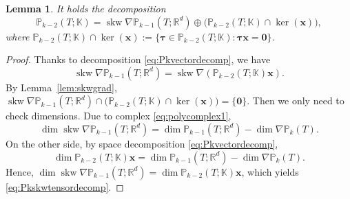\documentclass[10pt]{amsart}
\newtheorem{lemma}[theorem]{Lemma}
\newcommand{\skw}{\operatorname{skw}}
\numberwithin{equation}{section}
\begin{document}
\begin{lemma}
It holds the decomposition
\begin{equation}\label{eq:Pkskwtensordecomp}  
\mathbb P_{k-2}(T;\mathbb K)=\skw\nabla\mathbb P_{k-1}(T;\mathbb R^d)\oplus\big(\mathbb P_{k-2}(T;\mathbb K)\cap\ker(\boldsymbol{x})\big),
\end{equation}
where $\mathbb P_{k-2}(T;\mathbb K)\cap\ker(\boldsymbol{x}):=\{\boldsymbol{\tau}\in\mathbb P_{k-2}(T;\mathbb K): \boldsymbol{\tau}\boldsymbol{x}=\boldsymbol{0}\}$.
\end{lemma}
\begin{proof}
Thanks to decomposition \eqref{eq:Pkvectordecomp}, we have 
\[
\skw\nabla\mathbb P_{k-1}(T;\mathbb R^d)=\skw\nabla(\mathbb P_{k-2}(T;\mathbb K)\boldsymbol{x}).
\]
By Lemma~\ref{lem:skwgrad}, $\skw\nabla\mathbb P_{k-1}(T;\mathbb R^d)\cap\big(\mathbb P_{k-2}(T;\mathbb K)\cap\ker(\boldsymbol{x})\big)=\{\boldsymbol{0}\}$. Then we only need to check dimensions.
Due to complex \eqref{eq:polycomplex1},
\begin{equation}\label{eq:20220324-1}  
\dim\skw\nabla\mathbb P_{k-1}(T;\mathbb R^d)=\dim\mathbb P_{k-1}(T;\mathbb R^d)-\dim\nabla\mathbb P_k(T).
\end{equation}
On the other side, by space decomposition \eqref{eq:Pkvectordecomp},
\[
\dim\mathbb P_{k-2}(T;\mathbb K)\boldsymbol{x}=\dim\mathbb P_{k-1}(T;\mathbb R^{d})-\dim\nabla\mathbb P_k(T).
\]
Hence, $\dim\skw\nabla\mathbb P_{k-1}(T;\mathbb R^d)=\dim\mathbb P_{k-2}(T;\mathbb K)\boldsymbol{x}$, which yields \eqref{eq:Pkskwtensordecomp}.
\end{proof}

\end{document}

